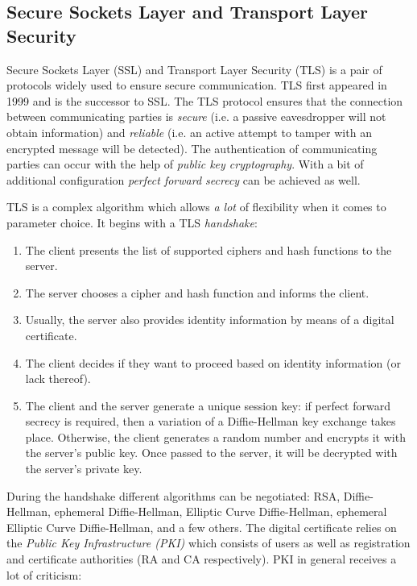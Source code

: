 \subsection{Secure Sockets Layer and Transport Layer Security}
\label{subsec:ssl-tls}

Secure Sockets Layer (SSL) and Transport Layer Security (TLS) is a pair of protocols widely used to ensure secure communication. TLS first appeared in 1999 and is the successor to SSL. The TLS protocol ensures that the connection between communicating parties is \emph{secure} (i.e. a passive eavesdropper will not obtain information) and \emph{reliable} (i.e. an active attempt to tamper with an encrypted message will be detected). The authentication of communicating parties can occur with the help of \emph{public key cryptography}. With a bit of additional configuration \emph{perfect forward secrecy} can be achieved as well.

TLS is a complex algorithm which allows \emph{a lot} of flexibility when it comes to parameter choice. It begins with a TLS \emph{handshake}:

\begin{enumerate}
    \item The client presents the list of supported ciphers and hash functions to the server.
    \item The server chooses a cipher and hash function and informs the client.
    \item Usually, the server also provides identity information by means of a digital certificate.
    \item The client decides if they want to proceed based on identity information (or lack thereof).
    \item The client and the server generate a unique session key: if perfect forward secrecy is required, then a variation of a Diffie-Hellman key exchange takes place. Otherwise, the client generates a random number and encrypts it with the server's public key. Once passed to the server, it will be decrypted with the server's private key.
  \end{enumerate}

During the handshake different algorithms can be negotiated: RSA, Diffie-Hellman, ephemeral Diffie-Hellman, Elliptic Curve Diffie-Hellman, ephemeral Elliptic Curve Diffie-Hellman, and a few others. The digital certificate relies on the \emph{Public Key Infrastructure (PKI)} which consists of users as well as registration and certificate authorities (RA and CA respectively). PKI in general receives a lot of criticism:

